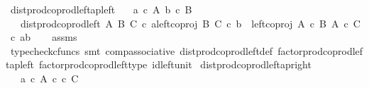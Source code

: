 \begin{isabellebody}
\endisatagproof
{\isafoldproof}%
%
\isadelimproof
\isanewline
%
\endisadelimproof
\isanewline
{}\isamarkupfalse%
\ dist{\isacharunderscore}{\kern0pt}prod{\isacharunderscore}{\kern0pt}coprod{\isacharunderscore}{\kern0pt}left{\isacharunderscore}{\kern0pt}ap{\isacharunderscore}{\kern0pt}left{\isacharcolon}{\kern0pt}\isanewline
\ \ \ {\isachardoublequoteopen}a\ {\isasymin}\isactrlsub c\ A{\isachardoublequoteclose}\ {\isachardoublequoteopen}b\ {\isasymin}\isactrlsub c\ B{\isachardoublequoteclose}\isanewline
\ \ \ {\isachardoublequoteopen}dist{\isacharunderscore}{\kern0pt}prod{\isacharunderscore}{\kern0pt}coprod{\isacharunderscore}{\kern0pt}left\ A\ B\ C\ {\isasymcirc}\isactrlsub c\ {\isasymlangle}a{\isacharcomma}{\kern0pt}left{\isacharunderscore}{\kern0pt}coproj\ B\ C\ {\isasymcirc}\isactrlsub c\ b{\isasymrangle}\ {\isacharequal}{\kern0pt}\ left{\isacharunderscore}{\kern0pt}coproj\ {\isacharparenleft}{\kern0pt}A\ {\isasymtimes}\isactrlsub c\ B{\isacharparenright}{\kern0pt}\ {\isacharparenleft}{\kern0pt}A\ {\isasymtimes}\isactrlsub c\ C{\isacharparenright}{\kern0pt}\ {\isasymcirc}\isactrlsub c\ {\isasymlangle}a{\isacharcomma}{\kern0pt}b{\isasymrangle}{\isachardoublequoteclose}\isanewline
%
\isadelimproof
\ \ %
\endisadelimproof
%
\isatagproof
{}\isamarkupfalse%
\ assms\ \isamarkupfalse%
\ {\isacharparenleft}{\kern0pt}typecheck{\isacharunderscore}{\kern0pt}cfuncs{\isacharcomma}{\kern0pt}\ smt\ comp{\isacharunderscore}{\kern0pt}associative{}\ dist{\isacharunderscore}{\kern0pt}prod{\isacharunderscore}{\kern0pt}coprod{\isacharunderscore}{\kern0pt}left{\isacharunderscore}{\kern0pt}def{}\ factor{\isacharunderscore}{\kern0pt}prod{\isacharunderscore}{\kern0pt}coprod{\isacharunderscore}{\kern0pt}left{\isacharunderscore}{\kern0pt}ap{\isacharunderscore}{\kern0pt}left\ factor{\isacharunderscore}{\kern0pt}prod{\isacharunderscore}{\kern0pt}coprod{\isacharunderscore}{\kern0pt}left{\isacharunderscore}{\kern0pt}type\ id{\isacharunderscore}{\kern0pt}left{\isacharunderscore}{\kern0pt}unit{}{\isacharparenright}{\kern0pt}%
\endisatagproof
{\isafoldproof}%
%
\isadelimproof
\isanewline
%
\endisadelimproof
\isanewline
{}\isamarkupfalse%
\ dist{\isacharunderscore}{\kern0pt}prod{\isacharunderscore}{\kern0pt}coprod{\isacharunderscore}{\kern0pt}left{\isacharunderscore}{\kern0pt}ap{\isacharunderscore}{\kern0pt}right{\isacharcolon}{\kern0pt}\isanewline
\ \ \ {\isachardoublequoteopen}a\ {\isasymin}\isactrlsub c\ A{\isachardoublequoteclose}\ {\isachardoublequoteopen}c\ {\isasymin}\isactrlsub c\ C{\isachardoublequoteclose}\isanewline

\end{isabellebody}
